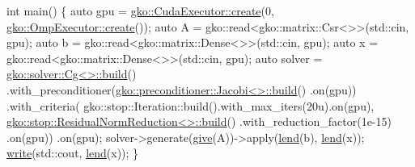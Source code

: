 \begin{DoxyCodeInclude}
\textcolor{keywordtype}{int} main()
\{
    \textcolor{keyword}{auto} gpu = \hyperlink{classgko_1_1CudaExecutor_a2718a92034350650ef406ffdb60db090}{gko::CudaExecutor::create}(0, 
      \hyperlink{classgko_1_1OmpExecutor_a33ca05fdd0fc928ee262fc9425304874}{gko::OmpExecutor::create}());
    \textcolor{keyword}{auto} A = gko::read<gko::matrix::Csr<>>(std::cin, gpu);
    \textcolor{keyword}{auto} b = gko::read<gko::matrix::Dense<>>(std::cin, gpu);
    \textcolor{keyword}{auto} x = gko::read<gko::matrix::Dense<>>(std::cin, gpu);
    \textcolor{keyword}{auto} solver =
        \hyperlink{classgko_1_1solver_1_1Cg}{gko::solver::Cg<>::build}()
            .with\_preconditioner(\hyperlink{classgko_1_1preconditioner_1_1Jacobi}{gko::preconditioner::Jacobi<>::build}()
      .on(gpu))
            .with\_criteria(
                gko::stop::Iteration::build().with\_max\_iters(20u).on(gpu),
                \hyperlink{classgko_1_1stop_1_1ResidualNormReduction}{gko::stop::ResidualNormReduction<>::build}()
                    .with\_reduction\_factor(1e-15)
                    .on(gpu))
            .on(gpu);
    solver->generate(\hyperlink{namespacegko_acbd3fd6d07e498892881e8e2ab0b4167}{give}(A))->apply(\hyperlink{namespacegko_aa8cb4876b72e5e1036ea9575443c439b}{lend}(b), \hyperlink{namespacegko_aa8cb4876b72e5e1036ea9575443c439b}{lend}(x));
    \hyperlink{namespacegko_a859dc47a462721d83728d91ab7fa2148}{write}(std::cout, \hyperlink{namespacegko_aa8cb4876b72e5e1036ea9575443c439b}{lend}(x));
\}
\end{DoxyCodeInclude}
 